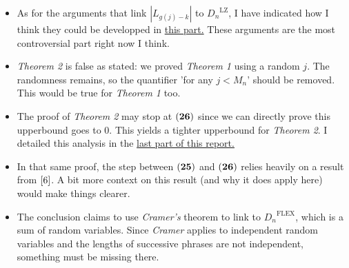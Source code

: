 \begin{itemize}
\item As for the arguments that 
      link $|L_{g(j)-k}|$ to ${D_n}^{\text{LZ}}$, I have
      indicated how I think they could be developped in 
      \hyperlink{critics}{this part.} These arguments
      are the most controversial part right now I think.

\item \emph{Theorem 2} is false as stated: we proved \emph{Theorem 1}
      using a random $j$. The randomness remains, so the quantifier
      'for any $j < M_n$' should be removed. This would be true for 
      \emph{Theorem 1} too.

\item The proof of \emph{Theorem 2} may stop at $\mathbf{(26)}$
      since we can directly prove this upperbound goes to $0$.
      This yields a tighter upperbound for \emph{Theorem 2}.
      I detailed this analysis in the 
      \hyperlink{upperbound}{last part of this report.}

\item In that same proof, the step between $\mathbf{(25)}$ and 
      $\mathbf{(26)}$ relies heavily on a result from $\pac{6}$.
      A bit more context on this result (and why it does apply here)
      would make things clearer.

\item The conclusion claims to use \emph{Cramer's} theorem to link
      to ${D_n}^{\text{FLEX}}$, which is a sum of random variables.
      Since \emph{Cramer} applies to independent random variables and the 
      lengths of successive phrases are not independent, something must be missing 
      there.
      
\end{itemize}